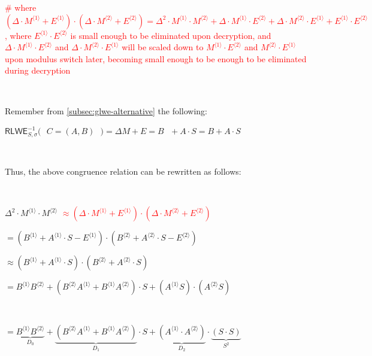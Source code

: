 \textcolor{red}{\# where $(\Delta \cdot M^{\langle 1 \rangle} + E^{\langle 1 \rangle} ) \cdot ( \Delta \cdot M^{\langle 2 \rangle} + E^{\langle 2 \rangle} ) = \Delta^2\cdot M^{\langle 1 \rangle} \cdot M^{\langle 2 \rangle} + \Delta \cdot M^{\langle 1 \rangle} \cdot E^{\langle 2 \rangle} + \Delta \cdot M^{\langle 2 \rangle} \cdot E^{\langle 1 \rangle} + E^{\langle 1 \rangle} \cdot E^{\langle 2 \rangle}$, where $E^{\langle 1 \rangle} \cdot E^{\langle 2 \rangle}$ is small enough to be eliminated upon decryption, and $\Delta \cdot M^{\langle 1 \rangle} \cdot E^{\langle 2 \rangle}$ and $\Delta \cdot M^{\langle 2 \rangle} \cdot E^{\langle 1 \rangle}$ will be scaled down to $M^{\langle 1 \rangle} \cdot E^{\langle 2 \rangle}$ and $M^{\langle 2 \rangle} \cdot E^{\langle 1 \rangle}$ upon modulus switch later, becoming small enough to be enough to be eliminated during decryption}

$ $

Remember from \autoref{subsec:glwe-alternative} the following: 

$\textsf{RLWE}^{-1}_{S,\sigma}\bm{(} \text{ } C = (A, B) \text{ } \bm{)} = \Delta  M + E = B \text{ } + A \cdot S = B + A\cdot S$ 

$ $

Thus, the above congruence relation can be rewritten as follows:

$ $

$\Delta^2 \cdot M^{\langle 1 \rangle} \cdot M^{\langle 2 \rangle}$ \textcolor{red}{$ \approx (\Delta \cdot M^{\langle 1 \rangle} + E^{\langle 1 \rangle} ) \cdot ( \Delta \cdot M^{\langle 2 \rangle} + E^{\langle 2 \rangle} )$}

$ = (B^{\langle 1 \rangle}  + A^{\langle 1 \rangle} \cdot S - E^{\langle 1 \rangle}) \cdot (B^{\langle 2 \rangle}  + A^{\langle 2 \rangle} \cdot S - E^{\langle 2 \rangle})$

$ \approx (B^{\langle 1 \rangle}  + A^{\langle 1 \rangle} \cdot S) \cdot (B^{\langle 2 \rangle}  + A^{\langle 2 \rangle} \cdot S)$




$ = B^{\langle 1 \rangle}B^{\langle 2 \rangle}  + (B^{\langle 2 \rangle}A^{\langle 1 \rangle} + B^{\langle 1 \rangle}A^{\langle 2 \rangle}) \cdot S  + (A^{\langle 1 \rangle}S)\cdot(A^{\langle 2 \rangle}S)$

$ $



$ = \underbrace{B^{\langle 1 \rangle}B^{\langle 2 \rangle}}_{D_0}  + \underbrace{(B^{\langle 2 \rangle}A^{\langle 1 \rangle} + B^{\langle 1 \rangle}A^{\langle 2 \rangle})}_{D_1} \cdot S + \underbrace{(A^{\langle 1 \rangle} \cdot A^{\langle 2 \rangle})}_{D_2} \cdot \underbrace{(S \cdot S)}_{ S^2}$

